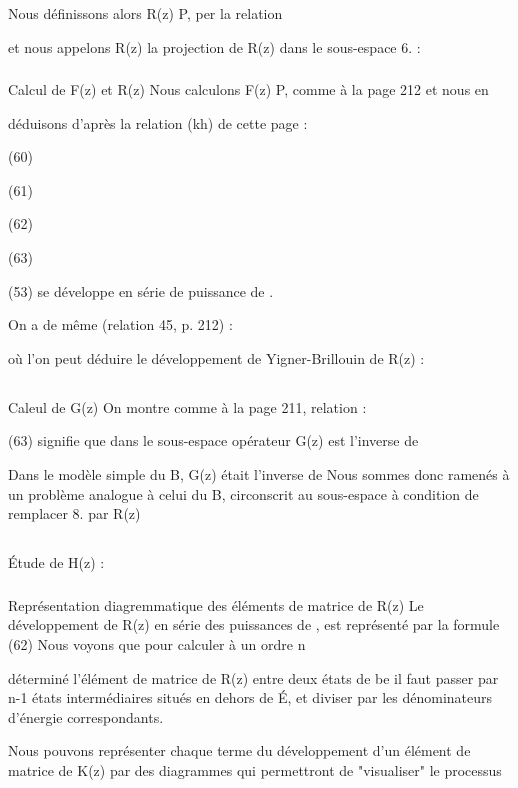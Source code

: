 Nous définissons alors R(z) P, per la relation

et nous appelons R(z) la projection de R(z) dans le sous-espace 6. :

\subsubsection{} Calcul de F(z) et R(z)%
Nous calculons F(z) P, comme à la page 212 et nous en

déduisons d'après la relation (kh) de cette page :

(60)

(61)

(62)

(63)


(53) se développe en série de puissance de .

On a de même (relation 45, p. 212) :

où l'on peut déduire le développement de Yigner-Brillouin de R(z) :

\subsection{} Caleul de G(z)%
On montre comme à la page 211, relation :

(63) signifie que dans le sous-espace  opérateur G(z) est l'inverse de

Dans le modèle simple du  B, G(z) était l'inverse de
Nous sommes donc ramenés à un problème analogue à celui du  B, circonscrit
au sous-espace à condition de remplacer 8. par R(z)
\subsection{} Étude de H(z) :%
\subsubsection{} Représentation diagremmatique des éléments de matrice
de R(z)%
Le développement de R(z) en série des puissances de ,
est représenté par la formule (62) Nous voyons que pour calculer à un ordre n

déterminé l'élément de matrice de R(z) entre deux états de be il faut passer
par n-1 états intermédiaires situés en dehors de É, et diviser par les dénominateurs d'énergie correspondants.

Nous pouvons représenter chaque terme du développement d'un élément
de matrice de K(z) par des diagrammes qui permettront de "visualiser" le processus


